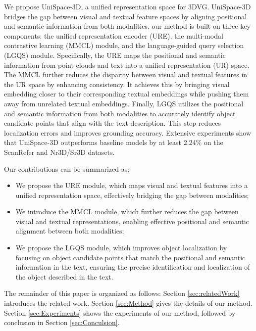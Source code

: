 \documentclass[lettersize,journal]{IEEEtran}
\begin{document}
\IEEEpubidadjcol

\par We propose UniSpace-3D, a unified representation space for 3DVG.
UniSpace-3D bridges the gap between visual and textual feature spaces by aligning positional and semantic information from both modalities. 
our method is built on three key components: the unified representation encoder (URE), the multi-modal contrastive learning (MMCL) module, and the language-guided query selection (LGQS) module.
Specifically, the URE maps the positional and semantic information from point clouds and text into a unified representation (UR) space. 
The MMCL further reduces the disparity between visual and textual features in the UR space by enhancing consistency. It achieves this by bringing visual embedding closer to their corresponding textual embeddings while pushing them away from unrelated textual embeddings.
Finally, LGQS utilizes the positional and semantic information from both modalities to accurately identify object candidate points that align with the text description. This step reduces localization errors and improves grounding accuracy. Extensive experiments show that UniSpace-3D outperforms baseline models by at least 2.24\% on the ScanRefer and Nr3D/Sr3D datasets. 

Our contributions can be summarized as:
\begin{itemize}
    \item We propose the URE module, which maps visual and textual features into a unified representation space, effectively bridging the gap between modalities;
    \item We introduce the MMCL module, which further reduces the gap between visual and textual representations, enabling effective positional and semantic alignment between both modalities;
    \item We propose the LGQS module, which improves object localization by focusing on object candidate points that match the positional and semantic information in the text, ensuring the precise identification and localization of the object described in the text.
\end{itemize}
\par The remainder of this paper is organized as follows: Section \ref{sec:relatedWork} introduces the related work. Section \ref{sec:Method}  gives the details of our method. Section \ref{sec:Experiments} shows the experiments of our method, followed by conclusion in Section \ref{sec:Conculsion}. 

\IEEEpubidadjcol
\end{document}
